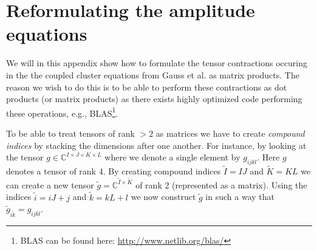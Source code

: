 \chapter{Reformulating the amplitude equations}
    \label{app:ccsd-dot-products}
    We will in this appendix show how to formulate the tensor contractions
    occuring in the the coupled cluster equations from Gauss et
    al.\cite{gauss1995coupled} as matrix products. The reason we wish to do this
    is to be able to perform these contractions as dot products (or matrix
    products) as there exists highly optimized code performing these operations,
    e.g., BLAS\footnote{BLAS can be found here:
    \url{http://www.netlib.org/blas/}}.

    To be able to treat tensors of rank $> 2$ as matrices we have to create
    \emph{compound indices} by stacking the dimensions after one another. For
    instance, by looking at the tensor $g \in \mathbb{C}^{I \times J \times K
    \times L}$ where we denote a single element by $g_{ijkl}$. Here $g$ denotes
    a tensor of rank 4. By creating compound indices $\tilde{I} = IJ$ and
    $\tilde{K} = KL$ we can create a new tensor $\tilde{g} =
    \mathbb{C}^{\tilde{I} \times \tilde{K}}$ of rank 2 (represented as a
    matrix). Using the indices $\tilde{i} = iJ + j$ and $\tilde{k} = kL + l$ we
    now construct $\tilde{g}$ in such a way that $\tilde{g}_{\tilde{i}\tilde{k}}
    = g_{ijkl}$.
